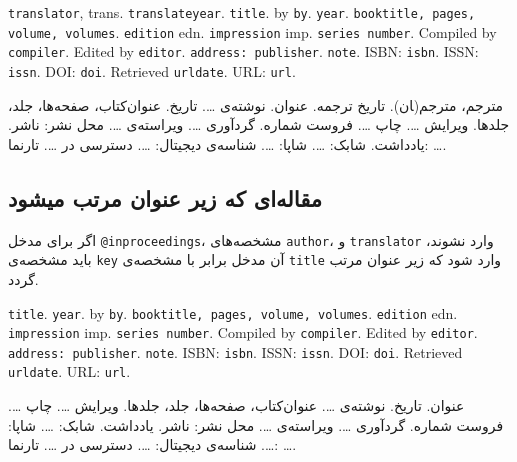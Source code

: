\documentclass[a4paper,11pt]{article}
\begin{document}
\begin{itemize}[nosep]
\begin{latin}
\item[] []
{\tt translator}, trans. {\tt translateyear}. {\tt title}. by {\tt by}. {\tt year}. {\tt booktitle, pages, volume, volumes}. {\tt edition} edn. {\tt impression} imp. {\tt series number}. Compiled by {\tt compiler}. Edited by {\tt editor}. {\tt address: publisher}. {\tt note}. ISBN: {\tt isbn}. ISSN: {\tt issn}. DOI: {\tt doi}. Retrieved {\tt urldate}. URL: {\tt url}. 
\end{latin}

\item[] []
{\persianttfamily مترجم}، مترجم(‍ان). {\persianttfamily تاریخ ترجمه}. {\persianttfamily عنوان}. نوشته‌ی {\persianttfamily …}. {\persianttfamily تاریخ}. {\persianttfamily عنوان‌کتاب، صفحه‌ها، جلد، جلدها}. ویرایش {\persianttfamily …}. چاپ {\persianttfamily …}. {\persianttfamily فروست شماره}. گردآوری {\persianttfamily …}. ویراسته‌ی {\persianttfamily …}. {\persianttfamily محل نشر: ناشر}. {\persianttfamily یادداشت}. شابک: {\persianttfamily …}. شاپا: {\persianttfamily …}. شناسه‌ی دیجیتال: {\persianttfamily …}. دسترسی در {\persianttfamily …}. تارنما: {\persianttfamily …}. 
\end{itemize}





\subsection{مقاله‌ای که زیر عنوان مرتب میشود}
اگر برای مدخل \verb|@inproceedings|، مشخصه‌های \verb|author|، و \verb|translator| وارد نشوند، باید مشخصه‌ی \verb|key| آن مدخل برابر با مشخصه‌ی \verb|title| وارد شود که زیر عنوان مرتب گردد.

\begin{itemize}[nosep]
\begin{latin}
\item[] []
{\tt title}. {\tt year}. by {\tt by}. {\tt booktitle, pages, volume, volumes}. {\tt edition} edn. {\tt impression} imp. {\tt series number}. Compiled by {\tt compiler}. Edited by {\tt editor}. {\tt address: publisher}. {\tt note}. ISBN: {\tt isbn}. ISSN: {\tt issn}. DOI: {\tt doi}. Retrieved {\tt urldate}. URL: {\tt url}. 
\end{latin}

\item[] []
{\persianttfamily عنوان}. {\persianttfamily تاریخ}. نوشته‌ی {\persianttfamily …}. {\persianttfamily عنوان‌کتاب، صفحه‌ها، جلد، جلدها}. ویرایش {\persianttfamily …}. چاپ {\persianttfamily …}. {\persianttfamily فروست شماره}. گردآوری {\persianttfamily …}. ویراسته‌ی {\persianttfamily …}. {\persianttfamily محل نشر: ناشر}. {\persianttfamily یادداشت}. شابک: {\persianttfamily …}. شاپا: {\persianttfamily …}. شناسه‌ی دیجیتال: {\persianttfamily …}. دسترسی در {\persianttfamily …}. تارنما: {\persianttfamily …}. 
\end{itemize}
\end{document}
